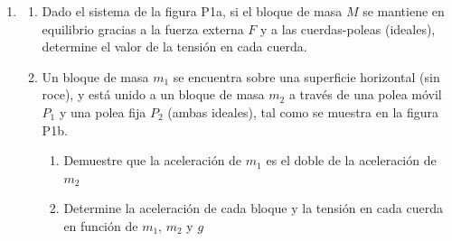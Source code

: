 \documentclass[letterpaper,11pt]{article}
\begin{document}
\vspace{-1cm}
\begin{enumerate}\setlength{\itemsep}{0.4cm}

\vspace{2em}

\item
    \begin{enumerate}
        \item 
            Dado el sistema de la figura P1a, si el bloque de masa $M$ se mantiene en equilibrio gracias a la fuerza externa $F$ y a las cuerdas-poleas (ideales), determine el valor de la tensión en cada cuerda.
            
        \item Un bloque de masa $m_1$ se encuentra sobre una superficie horizontal (sin roce), y está unido a un bloque de masa $m_2$ a través de una polea móvil $P_1$ y una polea fija $P_2$ (ambas ideales), tal como se muestra en la figura P1b.
        
        \begin{enumerate}
            \item Demuestre que la aceleración de $m_1$ es el doble de la aceleración de $m_2$
            
            \item Determine la aceleración de cada bloque y la tensión en cada cuerda en función de $m_1$, $m_2$ y $g$
        \end{enumerate}
        

\end{enumerate}
\end{enumerate}
\end{document}
